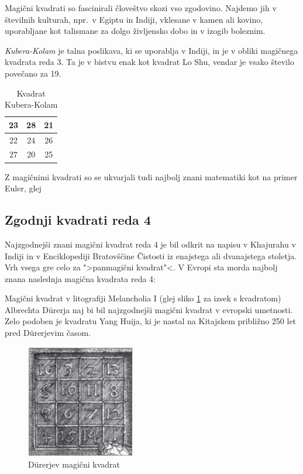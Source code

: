 \documentclass[a4paper,12pt]{article}
\begin{document}
Magični kvadrati so fascinirali človeštvo skozi vso zgodovino. Najdemo jih
v številnih kulturah, npr.\ v Egiptu in Indiji, vklesane v kamen ali
kovino, uporabljane kot talismane za dolgo življensko dobo in v
izogib boleznim.

\emph{Kubera-Kolam} je talna poslikava, ki se uporablja v Indiji, in je v
obliki magičnega kvadrata reda 3. Ta je v bistvu enak kot kvadrat
Lo Shu, vendar je vsako število povečano za 19.


\begin{table}
   \centering
   \caption{Kvadrat Kubera-Kolam}
   \label{kubera}
   \begin{tabular}{|c|c|c|}
      \hline
   23 & 28 & 21 \\\hline
   22 & 24 & 26 \\\hline
   27 & 20 & 25 \\\hline
\end{tabular}
\end{table}

Z magičnimi kvadrati so se ukvarjali tudi najbolj znani matematiki kot na
primer Euler, glej~\cite{euler}


\newpage

\subsection{Zgodnji kvadrati reda 4}

Najzgodnejši znani magični kvadrat reda 4 je bil odkrit na napisu
v Khajurahu v Indiji in v Enciklopediji Bratovščine Čistosti iz enajstega
ali dvanajstega stoletja. Vrh vsega gre celo za ">panmagični kvadrat"<.
V Evropi sta morda najbolj znana naslednja magična kvadrata reda 4:

Magični kvadrat v litografiji Melancholia I (glej sliko \ref{fig:durer}
za izsek s kvadratom) Albrechta Dürerja naj bi bil najzgodnejši magični kvadrat
v evropski umetnosti. Zelo podoben je kvadratu Yang Huija, ki je nastal na Kitajskem
približno 250 let pred Dürerjevim časom.


\begin{figure}[!ht]
   \centering
   \caption{Dürerjev magični kvadrat}
   \label{fig:durer}
	\includegraphics[scale=1.3]{durer.png}

\end{figure}
\end{document}
